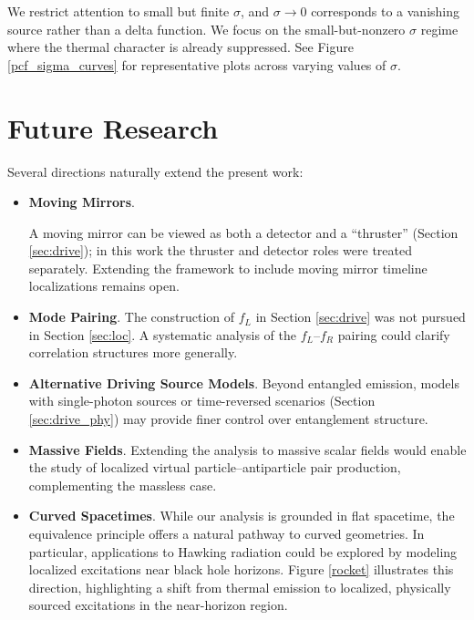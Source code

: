 \documentclass[12pt,a4paper]{article}
\begin{document}
{We restrict attention to small but finite $\sigma$, and $\sigma \rightarrow 0$ corresponds to a vanishing source rather than a delta function. We focus on the small-but-nonzero $\sigma$ regime where the thermal character is already suppressed. See Figure \ref{pcf_sigma_curves} for representative plots across varying values of $\sigma$.

\section{Future Research} \label{sec:future}

Several directions naturally extend the present work:
\begin{itemize}
\item {\bf Moving Mirrors}.

A moving mirror can be viewed as both a detector and a ``thruster'' (Section \ref{sec:drive}); in this work the thruster and detector roles were treated separately. Extending the framework to include moving mirror timeline localizations remains open.

\item {\bf Mode Pairing}. The construction of $f_L$ in Section \ref{sec:drive} was not pursued in Section \ref{sec:loc}. A systematic analysis of the $f_L$–$f_R$ pairing could clarify correlation structures more generally.

\item {\bf Alternative Driving Source Models}. Beyond entangled emission, models with single-photon sources or time-reversed scenarios (Section \ref{sec:drive_phy}) may provide finer control over entanglement structure.

\item {\bf Massive Fields}. Extending the analysis to massive scalar fields would enable the study of localized virtual particle–antiparticle pair production, complementing the massless case.

\item {\bf Curved Spacetimes}. While our analysis is grounded in flat spacetime, the equivalence principle offers a natural pathway to curved geometries. In particular, applications to Hawking radiation could be explored by modeling localized excitations near black hole horizons. Figure \ref{rocket} illustrates this direction, highlighting a shift from thermal emission to localized, physically sourced excitations in the near-horizon region.

\end{itemize}

}
\end{document}
